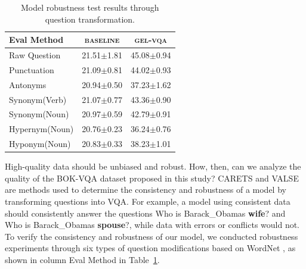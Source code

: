 \documentclass[letterpaper]{article} %
\begin{document}
\begin{table}[h]
\centering
\small
\begin{tabular}{lcc}
\toprule
Eval Method     & \textsc{baseline}   & \textsc{gel-vqa}   \\
\midrule
Raw Question            &21.51$\pm$1.81     &45.08$\pm$0.94 \\     %
Punctuation             &21.09$\pm$0.81     &44.02$\pm$0.93 \\     %
Antonyms                &20.94$\pm$0.50      &37.23$\pm$1.62 \\     %
Synonym(Verb)           &21.07$\pm$0.77     &43.36$\pm$0.90 \\     %
Synonym(Noun)           &20.97$\pm$0.59     &42.79$\pm$0.91 \\     %
Hypernym(Noun)          &20.76$\pm$0.23     &36.24$\pm$0.76 \\     %
Hyponym(Noun)           &20.83$\pm$0.33     &38.23$\pm$1.01 \\     %
\bottomrule
\end{tabular}
\caption{Model robustness test results through question transformation.}
\label{tab:robustness}
\end{table}

High-quality data should be unbiased and robust. How, then, can we analyze the quality of the BOK-VQA dataset proposed in this study? CARETS \cite{jimenez2022carets} and VALSE \cite{parcalabescu-etal-2022-valse} are methods used to determine the consistency and robustness of a model by transforming questions into VQA. For example, a model using consistent data should consistently answer the questions Who is Barack\_Obamas \textbf{wife}? and Who is Barack\_Obamas \textbf{spouse}?, while data with errors or conflicts would not. To verify the consistency and robustness of our model, we conducted robustness experiments through six types of question modifications based on WordNet \cite{wordnet, nltk}, as shown in column Eval Method in Table~\ref{tab:robustness}.
\end{document}
